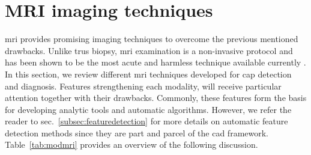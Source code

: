 \section{MRI imaging techniques}\label{sec:chp2:imaging}

\ac{mri} provides promising imaging techniques to overcome the previous mentioned drawbacks.
Unlike \ac{trus} biopsy, \ac{mri} examination is a non-invasive protocol and has been shown to be the most acute and harmless technique available currently \cite{Turkbey2012}.
In this section, we review different \ac{mri} techniques developed for \ac{cap} detection and diagnosis.
Features strengthening each modality, will receive particular attention together with their drawbacks.
Commonly, these features form the basis for developing analytic tools and automatic algorithms.
However, we refer the reader to \acs{sec}.~\ref{subsec:featuredetection} for more details on automatic feature detection methods since they are part and parcel of the \acs{cad} framework.
Table~\ref{tab:modmri} provides an overview of the following discussion.




